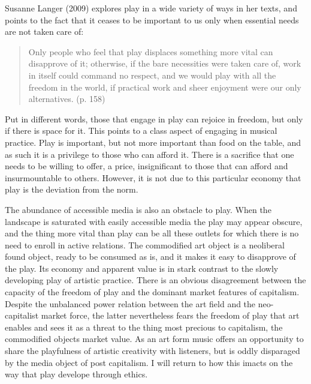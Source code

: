 \documentclass[11pt]{article}
\makeatletter
\newcommand{\cslcitation}[2]
 {\protect\hyper@linkstart{cite}{citeproc_bib_item_#1}#2\hyper@linkend}
\makeatother
\begin{document}
Susanne Langer (\cslcitation{14}{2009}) explores play in a wide variety of ways in her texts, and points to the fact that it ceases to be important to us only when essential needs are not taken care of:
\begin{quote}
Only people who feel that play displaces something more vital can disapprove of it; otherwise, if the bare necessities were taken care of, work in itself could command no respect, and we would play with all the freedom in the world, if practical work and sheer enjoyment were our only alternatives. (p. 158)
\end{quote}
Put in different words, those that engage in play can rejoice in freedom, but only if there is space for it. This points to a class aspect of engaging in musical practice. Play is important, but not more important than food on the table, and as such it is a privilege to those who can afford it. There is a sacrifice that one needs to be willing to offer, a price, insignificant to those that can afford and insurmountable to others. However, it is not due to this particular economy that play is the deviation from the norm. 

The abundance of accessible media is also an obstacle to play. When the landscape is saturated with easily accessible media the play may appear obscure, and the thing more vital than play can be all these outlets for which there is no need to enroll in active relations. The commodified art object is a neoliberal found object, ready to be consumed as is, and it makes it easy to disapprove of the play. Its economy and apparent value is in stark contrast to the slowly developing play of artistic practice. There is an obvious disagreement between the capacity of the freedom of play and the dominant market features of capitalism. Despite the unbalanced power relation between the art field and the neo-capitalist market force, the latter nevertheless fears the freedom of play that art enables and sees it as a threat to the thing most precious to capitalism, the commodified objects market value. As an art form music offers an opportunity to share the playfulness of artistic creativity with listeners, but is oddly disparaged by the media object of post capitalism. I will return to how this imacts on the way that play develope through ethics.
\end{document}
